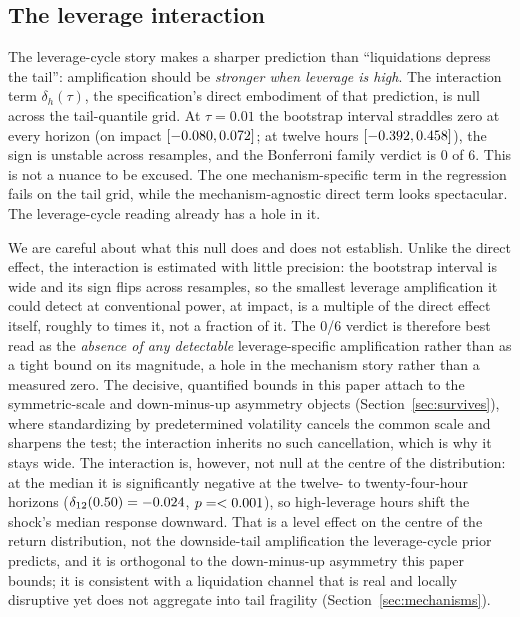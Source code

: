 \subsection{The leverage interaction}
\label{sec:apparent-crack}

The leverage-cycle story makes a sharper prediction than ``liquidations
depress the tail'': amplification should be \emph{stronger when leverage is
high}. The interaction term $\delta_h(\tau)$, the specification's direct
embodiment of that prediction, is null across the tail-quantile grid. At $\tau = 0.01$ the
bootstrap interval straddles zero at every horizon (on impact
$[-0.080, 0.072]$; at twelve hours
$[-0.392, 0.458]$), the sign is unstable across
resamples, and the Bonferroni family verdict is 0 of 6. This is not a
nuance to be excused. The one mechanism-specific term in the regression
fails on the tail grid, while the mechanism-agnostic direct term looks
spectacular. The leverage-cycle reading already has a hole in it.

We are careful about what this null does and does not establish. Unlike the
direct effect, the interaction is estimated with little precision: the
bootstrap interval is wide and its sign flips across resamples, so the
smallest leverage amplification it could detect at conventional power,
\MdeDeltaHzero{} at impact, is a multiple of the direct effect itself,
roughly \MdeDeltaRatioMin{} to \MdeDeltaRatioMax{} times it, not a fraction
of it. The 0/6 verdict
is therefore best read as the \emph{absence of any detectable}
leverage-specific amplification rather than as a tight bound on its
magnitude, a hole in the mechanism story rather than a measured zero. The
decisive, quantified bounds in this paper attach to the symmetric-scale and
down-minus-up asymmetry objects (Section~\ref{sec:survives}), where
standardizing by predetermined volatility cancels the common scale and
sharpens the test; the interaction inherits no such cancellation, which is
why it stays wide. The interaction is, however, not null at the centre of the
distribution: at the median it is significantly negative at the twelve- to
twenty-four-hour horizons ($\delta_{12}(0.50) = -0.024$,
$p = <0.001$), so high-leverage hours shift the shock's median
response downward. That is a level effect on the centre of the return
distribution, not the downside-tail amplification the leverage-cycle prior
predicts, and it is orthogonal to the down-minus-up asymmetry this paper
bounds; it is consistent with a liquidation channel that is real and locally
disruptive yet does not aggregate into tail fragility
(Section~\ref{sec:mechanisms}).

